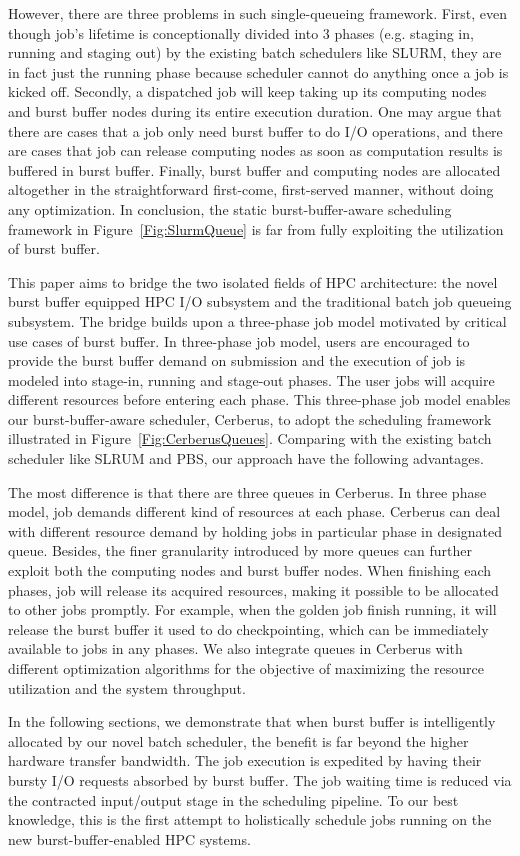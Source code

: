 However, there are three problems in such single-queueing framework.
First, even though job's lifetime is conceptionally divided into 3 phases
(e.g. staging in, running and staging out) by the existing batch schedulers like SLURM,
they are in fact just the running phase because scheduler cannot do anything once a job is kicked off.
Secondly, a dispatched job will keep taking up its computing nodes and burst buffer nodes during its entire execution duration.
One may argue that there are cases that a job only need burst buffer to do I/O operations,
and there are cases that job can release computing nodes as soon as computation results is buffered
in burst buffer.
Finally, burst buffer and computing nodes are allocated altogether
in the straightforward first-come, first-served manner, without doing any optimization.
In conclusion, the static burst-buffer-aware scheduling framework in Figure~\ref{Fig:SlurmQueue}
is far from fully exploiting the utilization of burst buffer.

This paper aims to bridge the two isolated fields of HPC architecture:
the novel burst buffer equipped HPC I/O subsystem and the
traditional batch job queueing subsystem.
The bridge builds upon a three-phase job model motivated by critical use cases of burst buffer.
In three-phase job model, users are encouraged to provide the burst buffer demand on submission
and the execution of job is modeled into stage-in, running and stage-out phases.
The user jobs will acquire different resources before entering each phase.
This three-phase job model enables our burst-buffer-aware scheduler, Cerberus,
to adopt the scheduling framework illustrated in Figure~\ref{Fig:CerberusQueues}.
Comparing with the existing batch scheduler like SLRUM and PBS,
our approach have the following advantages.

The most difference is that there are three queues in Cerberus.
In three phase model, job demands different kind of resources at each phase.
Cerberus can deal with different resource demand by holding jobs in particular phase in designated queue.
Besides, the finer granularity introduced by more queues can further exploit
both the computing nodes and burst buffer nodes.
When finishing each phases, job will release its acquired resources, making it possible
to be allocated to other jobs promptly.
For example, when the golden job finish running, it will release the burst buffer it used to
do checkpointing, which can be immediately available to jobs in any phases.
We also integrate queues in Cerberus with different optimization algorithms for the
objective of maximizing the resource utilization and the system throughput.

In the following sections, we demonstrate that when burst buffer is intelligently allocated
by our novel batch scheduler, the benefit is far beyond the higher hardware transfer bandwidth.
The job execution is expedited by having their bursty I/O requests absorbed by burst buffer.
The job waiting time is reduced via the contracted input/output stage in the scheduling pipeline.
To our best knowledge, this is the first attempt to holistically schedule jobs
running on the new burst-buffer-enabled HPC systems.


